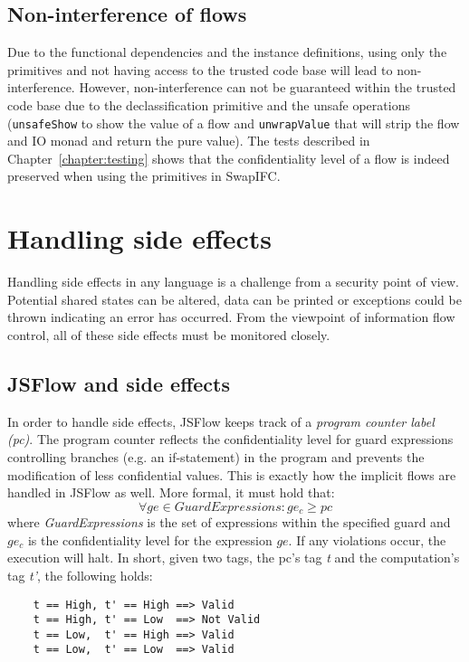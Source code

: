 \subsection{Non-interference of flows}
Due to the functional dependencies and the instance definitions, using only the primitives and not having access to the trusted code base will lead to non-interference. However, non-interference can not be guaranteed within the trusted code base due to the declassification primitive and the unsafe operations ({\tt unsafeShow} to show the value of a flow and {\tt unwrapValue} that will strip the flow and IO monad and return the pure value). The tests described in Chapter~\ref{chapter:testing} shows that the confidentiality level of a flow is indeed preserved when using the primitives in SwapIFC.

\section{Handling side effects}
Handling side effects in any language is a challenge from a security point of view. Potential shared states can be altered, data can be printed or exceptions could be thrown indicating an error has occurred. From the viewpoint of information flow control, all of these side effects must be monitored closely.

\subsection{JSFlow and side effects}
In order to handle side effects, JSFlow keeps track of a \emph{program counter label (pc)}. The program counter reflects the confidentiality level for guard expressions controlling branches (e.g. an if-statement) in the program and prevents the modification of less confidential values. This is exactly how the implicit flows are handled in JSFlow as well. More formal, it must hold that:
\[
\forall ge \in GuardExpressions: ge_c \geq pc
\]
where \emph{GuardExpressions} is the set of expressions within the specified guard and \(ge_c\) is the confidentiality level for the expression \(ge\). If any violations occur, the execution will halt. In short, given two tags, the pc's tag \emph{t} and the computation's tag \emph{t'}, the following holds:
\begin{verbatim}
    t == High, t' == High ==> Valid
    t == High, t' == Low  ==> Not Valid
    t == Low,  t' == High ==> Valid
    t == Low,  t' == Low  ==> Valid
\end{verbatim}

